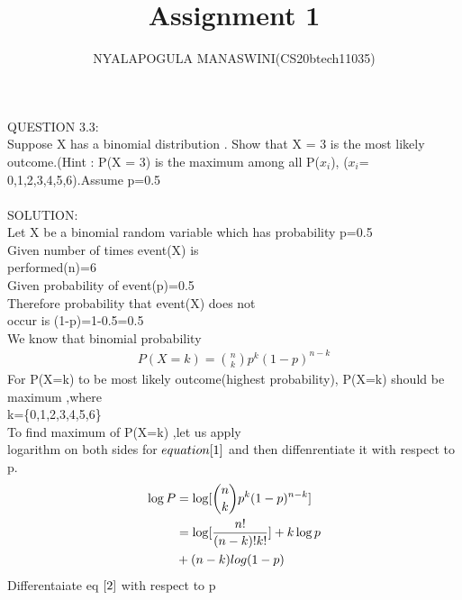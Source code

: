 \documentclass{assignment}
\begin{document}
\title{Assignment 1}
\author{NYALAPOGULA MANASWINI(CS20btech11035)}
\maketitle
\begin{paracol}{2}
\switchcolumn[0]
QUESTION 3.3:\\
Suppose X has a binomial
 distribution . Show that X = 3 is the most likely outcome.(Hint : P(X = 3) is the maximum among all P($x_i$), ($x_i$= 0,1,2,3,4,5,6).Assume p=0.5\\ 
 \\
SOLUTION:\\
Let X be a binomial random variable which has probability p=0.5\\
Given number of times event(X) is\\
 performed(n)=6\\
Given probability of event(p)=0.5\\
Therefore probability that event(X) does not \\occur is
(1-p)=1-0.5=0.5\\
We know that binomial probability\\
\begin{align}
P(X=k)= \binom{n}{k}p^k({1-p})^{n-k}  \label{1} 
\end{align}
For P(X=k) to be most likely outcome(highest probability),
P(X=k) should be maximum ,where\\
 k=\{0,1,2,3,4,5,6\}\\
To find maximum of P(X=k) ,let us  apply \\logarithm on both sides for $equation\eqref{1}$ and then diffenrentiate it with respect
to p.
\begin{align}
\log P&=\log[\binom{n}{k}p^k({1-p})^{n-k}]  \\
&=\log[\frac{n!}{(n-k)!k!}]+k \log p \notag \\
 &+(n-k)log (1-p) \label{2}
\end{align}
Differentaiate eq $\eqref{2}$ with respect to p\\ \\ \\ \\ \\ 


\end{paracol}
\end{document}
